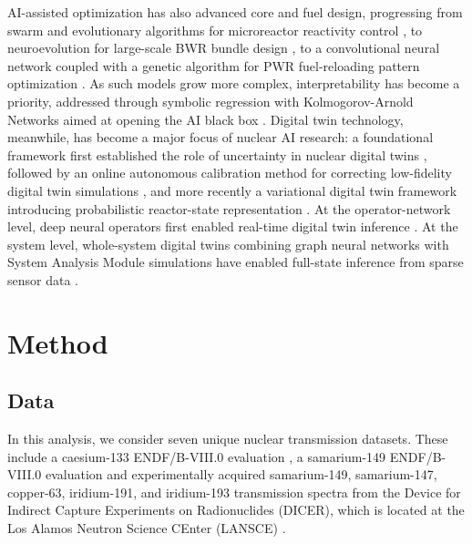 \documentclass{style/nseJournal}
\begin{document}
AI-assisted optimization has also advanced core and fuel design, progressing from swarm and evolutionary algorithms for microreactor reactivity control \cite{price2022multiobjective}, to neuroevolution for large-scale BWR bundle design \cite{radaideh2021large}, to a convolutional neural network coupled with a genetic algorithm for PWR fuel-reloading pattern optimization \cite{wan2022optimization}. As such models grow more complex, interpretability has become a priority, addressed through symbolic regression with Kolmogorov-Arnold Networks aimed at opening the AI black box \cite{panczyk2025opening}. Digital twin technology, meanwhile, has become a major focus of nuclear AI research: a foundational framework first established the role of uncertainty in nuclear digital twins \cite{kochunas2021digital}, followed by an online autonomous calibration method for correcting low-fidelity digital twin simulations \cite{song2022online}, and more recently a variational digital twin framework introducing probabilistic reactor-state representation \cite{burnett2026variational}. At the operator-network level, deep neural operators first enabled real-time digital twin inference \cite{kobayashi2024deep}. At the system level, whole-system digital twins combining graph neural networks with System Analysis Module simulations have enabled full-state inference from sparse sensor data \cite{liu2025development}.

\section{Method}
\subsection{Data}
\label{sec:data}
In this analysis, we consider seven unique nuclear transmission datasets. These include a caesium-133 ENDF/B-VIII.0 evaluation \cite{brown_endfb-viii0_2018}, a samarium-149 ENDF/B-VIII.0 evaluation \cite{brown_endfb-viii0_2018} and experimentally acquired samarium-149, samarium-147, copper-63, iridium-191, and iridium-193 transmission spectra from the Device for Indirect Capture Experiments on Radionuclides (DICER), which is located at the Los Alamos Neutron Science C{E}nter (LANSCE) \cite{STAMATOPOULOS2022166166, DICER_neutronNews, DICER_NIC, DICER_NuclearSecurity, LAPPD, 88Zr_PRC, 88Zr_PRL}. 
\end{document}
